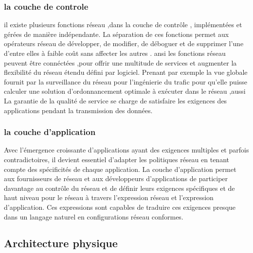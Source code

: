 \subsubsection{ la couche de controle}
il existe plusieurs fonctions réseau ,dans la couche de contrôle ,  implémentées et gérées de manière indépendante. La séparation de ces fonctions permet aux opérateurs réseau de développer, de modifier, de déboguer et de supprimer l'une d'entre elles à faible coût sans affecter les autres . ansi les fonctions réseau peuvent être connéctées ,pour offrir une multitude de services et augmenter la flexibilité du réseau étendu défini par logiciel. Prenant par exemple la vue globale fournit par la surveillance du réseau pour l'ingénierie du trafic pour qu’elle puisse calculer une solution d'ordonnancement optimale à exécuter dans le réseau ,aussi La garantie de la qualité de service se charge de satisfaire les exigences des applications pendant la transmission des données. 

\subsubsection{  la couche d’application }
Avec l'émergence croissante d'applications ayant des exigences multiples et parfois contradictoires, il devient essentiel d'adapter les politiques réseau en tenant compte des spécificités de chaque application.
La couche d’application permet aux fournisseurs de réseau et aux développeurs d'applications de participer davantage au contrôle du réseau et de définir leurs exigences spécifiques et de haut niveau pour le réseau à travers l'expression réseau et l'expression d'application. Ces expressions sont capables de traduire ces exigences presque dans un langage naturel en configurations réseau conformes. 
\subsection{Architecture physique }

